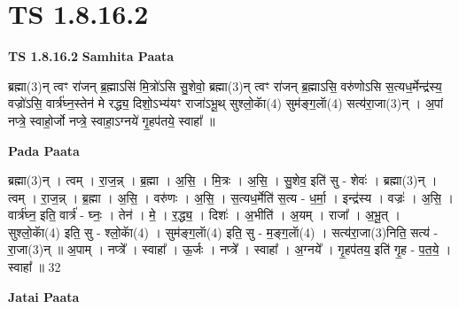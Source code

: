 \documentclass[17pt]{extarticle}
\begin{document}
\section*{ TS 1.8.16.2 }

\textbf{TS 1.8.16.2 } \newline
\textbf{Samhita Paata} \newline

ब्रह्मा(3)न् त्वꣳ रा॑जन् ब्र॒ह्माऽसि॑ मि॒त्रो॑ऽसि सु॒शेवो॒ ब्रह्मा(3)न् त्वꣳ रा॑जन् ब्र॒ह्माऽसि॒ वरु॑णोऽसि स॒त्यध॒र्मेन्द्र॑स्य॒ वज्रो॑ऽसि॒ वार्त्र॑घ्न॒स्तेन॑ मे रद्ध्य॒ दिशो॒ऽभ्य॑यꣳ राजा॑ऽभू॒थ् सुश्लो॒काॅ(4) सुम॑ङ्ग॒लाॅ(4) सत्य॑रा॒जा(3)न् । अ॒पां नप्त्रे॒ स्वाहो॒र्जो नप्त्रे॒ स्वाहा॒ऽग्नये॑ गृ॒हप॑तये॒ स्वाहा᳚ ॥ \newline

\textbf{Pada Paata} \newline

ब्रह्मा(3)न् । त्वम् । रा॒ज॒न्न् । ब्र॒ह्मा । अ॒सि॒ । मि॒त्रः । अ॒सि॒ । सु॒शेव॒ इति॑ सु - शेवः॑ । ब्रह्मा(3)न् । त्वम् । रा॒ज॒न्न् । ब्र॒ह्मा । अ॒सि॒ । वरु॑णः । अ॒सि॒ । स॒त्यध॒र्मेति॑ स॒त्य - ध॒र्मा॒ । इन्द्र॑स्य । वज्रः॑ । अ॒सि॒ । वार्त्र॑घ्न॒ इति॒ वार्त्र॑ - घ्नः॒ । तेन॑ । मे॒ । र॒द्ध्य॒ । दिशः॑ । अ॒भीति॑ । अ॒यम् । राजा᳚ । अ॒भू॒त् । सुश्लो॒काॅ(4) इति॒ सु - श्लो॒काॅ(4) । सुम॑ङ्ग॒लाॅ(4) इति॒ सु - म॒ङ्ग॒लाॅ(4) । सत्य॑रा॒जा(3)निति॒ सत्य॑ - रा॒जा(3)न् ॥ अ॒पाम् । नप्त्रे᳚ । स्वाहा᳚ । ऊ॒र्जः । नप्त्रे᳚ । स्वाहा᳚ । अ॒ग्नये᳚ । गृ॒हप॑तय॒ इति॑ गृ॒ह - प॒त॒ये॒ । स्वाहा᳚ ॥ 32  \newline



\textbf{Jatai Paata} \newline
\end{document}
